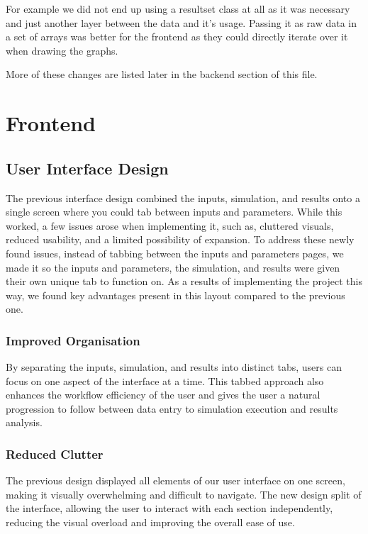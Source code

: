 \documentclass{article}
\begin{document}
    For example we did not end up using a resultset class at all as it was necessary and just another layer between
    the data and it's usage. Passing it as raw data in a set of arrays was better for the frontend as they could
    directly iterate over it when drawing the graphs.

    More of these changes are listed later in the backend section of this file.

    \section{Frontend}

    \subsection{User Interface Design}
    The previous interface design combined the inputs, simulation, and results onto a single screen where you could tab between inputs and parameters. While this worked,
    a few issues arose when implementing it, such as, cluttered visuals, reduced usability, and a limited possibility of expansion. To address these newly found issues,
    instead of tabbing between the inputs and parameters pages, we made it so the inputs and parameters, the simulation, and results were given their own unique tab to
    function on. As a results of implementing the project this way, we found key advantages present in this layout compared to the previous one.

    \subsubsection{Improved Organisation}
    By separating the inputs, simulation, and results into distinct tabs, users can focus on one aspect of the interface at a time. This tabbed approach also enhances
    the workflow efficiency of the user and gives the user a natural progression to follow between data entry to simulation execution and results analysis.

    \subsubsection{Reduced Clutter}
    The previous design displayed all elements of our user interface on one screen, making it visually overwhelming and difficult to navigate. The new design split of
    the interface, allowing the user to interact with each section independently, reducing the visual overload and improving the overall ease of use.
\end{document}
